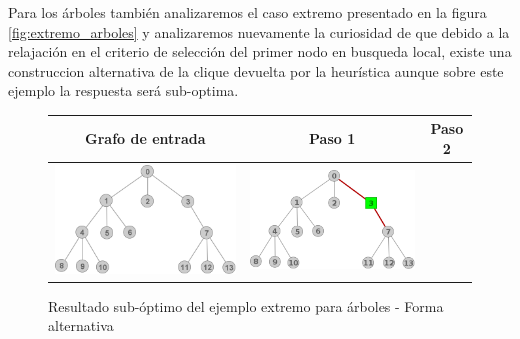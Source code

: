 Para los \'arboles tambi\'en analizaremos el caso extremo presentado 
en la figura \ref{fig:extremo_arboles} y analizaremos nuevamente
la curiosidad de que debido a la relajaci\'on en el criterio de 
selecci\'on del primer nodo en busqueda local, existe una 
construccion alternativa de la clique devuelta por la heur\'istica
aunque sobre este ejemplo la respuesta ser\'a sub-optima.

\begin{figure}[H]
\caption{Resultado sub-\'optimo del ejemplo extremo para \'arboles - 
Forma alternativa}
\begin{center}
		\begin{tabular}{|c||c||c|}
		\hline
		Grafo de entrada & Paso 1 & Paso 2 \\ 
			\hline
			\includegraphics[scale = 0.2]{img/ej3/busqueda_local/extremetree_st0.png} &
			\includegraphics[scale = 0.2]{img/ej3/busqueda_local/extremetree_st11.png} & 

\end{tabular}
\end{center}
\end{figure}
